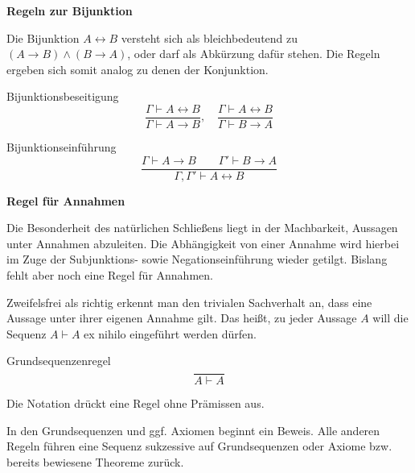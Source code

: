 \documentclass[8pt]{beamer}
\newcommand{\strong}[1]{\textsf{\textbf{#1}}}
\newcommand{\parspace}{\vspace{0.8em}}
\newcommand{\cond}{\rightarrow}
\newcommand{\bicond}{\leftrightarrow}
\begin{document}
\begin{frame}[t]
\vspace{0.5em}
\strong{Regeln zur Bijunktion}

\parspace
Die Bijunktion $A\bicond B$ versteht sich als bleichbedeutend zu
$(A\cond B)\land (B\cond A)$, oder darf als Abkürzung dafür stehen.
Die Regeln ergeben sich somit analog zu denen der Konjunktion.

\begin{block}{Bijunktionsbeseitigung}
\[\dfrac{\Gamma\vdash A\bicond B}{\Gamma\vdash A\cond B},\quad
\dfrac{\Gamma\vdash A\bicond B}{\Gamma\vdash B\cond A}\]
\end{block}

\begin{block}{Bijunktionseinführung}
\[\dfrac{\Gamma\vdash A\cond B\qquad\Gamma'\vdash B\cond A}
{\Gamma,\Gamma'\vdash A\bicond B}\]
\end{block}
\end{frame}

\begin{frame}[t]
\vspace{0.5em}
\strong{Regel für Annahmen}

\parspace
Die Besonderheit des natürlichen Schließens liegt in der Machbarkeit,
Aussagen unter Annahmen abzuleiten. Die Abhängigkeit von einer
Annahme wird hierbei im Zuge der Subjunktions- sowie Negationseinführung
wieder getilgt. Bislang fehlt aber noch eine Regel für Annahmen.\pause

\parspace
Zweifelsfrei als richtig erkennt man den trivialen Sachverhalt an, dass
eine Aussage unter ihrer eigenen Annahme gilt. Das heißt, zu jeder
Aussage $A$ will die Sequenz $A\vdash A$ ex nihilo eingeführt werden
dürfen.

\begin{block}{Grundsequenzenregel}
\[\dfrac{}{A\vdash A}\]
\end{block}

Die Notation drückt eine Regel ohne Prämissen aus.

\parspace
In den Grundsequenzen und ggf. Axiomen beginnt ein Beweis. Alle anderen
Regeln führen eine Sequenz sukzessive auf Grundsequenzen oder Axiome
bzw. bereits bewiesene Theoreme zurück.
\end{frame}
\end{document}
